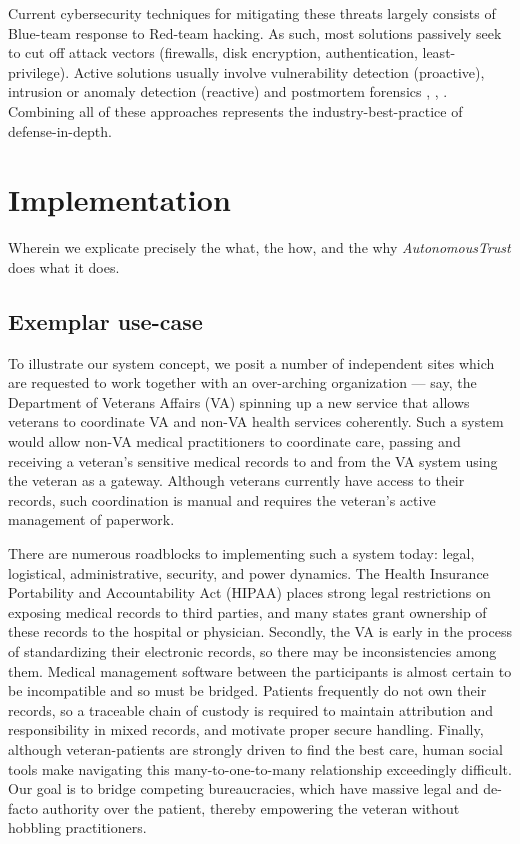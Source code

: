 \documentclass[10pt, twoside]{article}
\newcommand{\projectName}{\emph{AutonomousTrust }}
\begin{document}
Current cybersecurity techniques for mitigating these threats largely consists of Blue-team response to Red-team hacking. As such, most solutions passively seek to cut off attack vectors (firewalls, disk encryption, authentication, least-privilege). Active solutions usually involve vulnerability detection (proactive), intrusion or anomaly detection (reactive) and postmortem forensics \cite{anderson2020security}, \cite{brooks2018cybersecurity}, \cite{wittkop2022cybersecurity}. Combining all of these approaches represents the industry-best-practice of defense-in-depth.


\section{Implementation}

Wherein we explicate precisely the what, the how, and the why \projectName does what it does.

\subsection{Exemplar use-case} \label{use}

To illustrate our system concept, we posit a number of independent sites which are requested to work together with an over-arching organization --- say, the Department of Veterans Affairs (VA) spinning up a new service that allows veterans to coordinate VA and non-VA health services coherently. Such a system would allow non-VA medical practitioners to coordinate care, passing and receiving a veteran's sensitive medical records to and from the VA system using the veteran as a gateway. Although veterans currently have access to their records, such coordination is manual and requires the veteran's active management of paperwork.

There are numerous roadblocks to implementing such a system today: legal, logistical, administrative, security, and power dynamics. The Health Insurance Portability and Accountability Act (HIPAA) places strong legal restrictions on exposing medical records to third parties, and many states grant ownership of these records to the hospital or physician. Secondly, the VA is early in the process of standardizing their electronic records, so there may be inconsistencies among them. Medical management software between the participants is almost certain to be incompatible and so must be bridged. Patients frequently do not own their records, so a traceable chain of custody is required to maintain attribution and responsibility in mixed records, and motivate proper secure handling. Finally, although veteran-patients are strongly driven to find the best care, human social tools make navigating this many-to-one-to-many relationship exceedingly difficult. Our goal is to bridge competing bureaucracies, which have massive legal and de-facto authority over the patient, thereby empowering the veteran without hobbling practitioners. 
\end{document}

